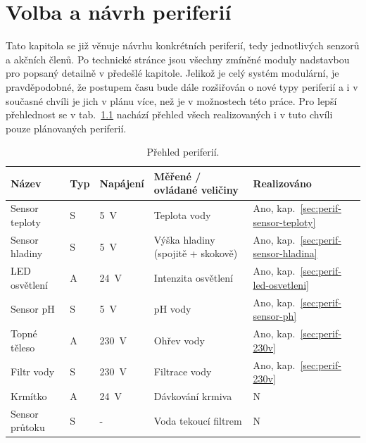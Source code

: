 \chapter{Volba a návrh periferií}
    Tato kapitola se již věnuje návrhu konkrétních periferií, tedy jednotlivých senzorů a akčních členů. Po technické stránce jsou všechny zmíněné moduly nadstavbou pro  popsaný detailně v předešlé kapitole. Jelikož je celý systém modulární, je pravděpodobné, že postupem času bude dále rozšiřován o nové typy periferií a i v současné chvíli je jich v plánu více, než je v možnostech této práce. Pro lepší přehlednost se v tab.~\ref{tab:prehled-periferii} nachází přehled všech realizovaných i v tuto chvíli pouze plánovaných periferií.

    \begin{table}[h]
        \centering
        \caption{Přehled periferií.}
        \label{tab:prehled-periferii}
        \begin{tabular}{|l|l|l|l|l|}
            \hline
            Název & Typ & Napájení & Měřené / ovládané veličiny & Realizováno \\ \hline\hline
            Sensor teploty  & S & \qty{5}{V}    & Teplota vody                       & Ano, kap.~\ref{sec:perif-sensor-teploty}  \\ \hline
            Sensor hladiny  & S & \qty{5}{V}    & Výška hladiny (spojitě + skokově)  & Ano, kap.~\ref{sec:perif-sensor-hladina}  \\ \hline
            LED osvětlení   & A & \qty{24}{V}   & Intenzita osvětlení                & Ano, kap.~\ref{sec:perif-led-osvetleni}  \\ \hline
            Sensor pH       & S & \qty{5}{V}    & pH vody                            & Ano, kap.~\ref{sec:perif-sensor-ph}  \\ \hline
            Topné těleso    & A & \qty{230}{V}  & Ohřev vody                         & Ano, kap.~\ref{sec:perif-230v}  \\ \hline
            Filtr vody      & S & \qty{230}{V}  & Filtrace vody                      & Ano, kap.~\ref{sec:perif-230v}  \\ \hline
            Krmítko         & A & \qty{24}{V}   & Dávkování krmiva                   & N  \\ \hline
            Sensor průtoku  & S & -             & Voda tekoucí filtrem               & N  \\ \hline

\end{tabular}
\end{table}
